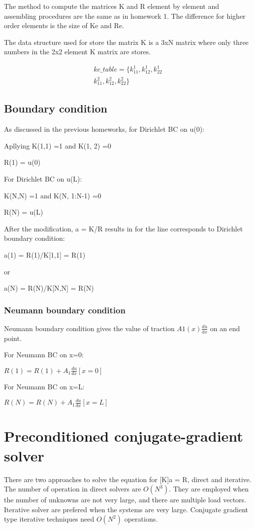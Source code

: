 \documentclass[paper=a4, fontsize=11pt]{article} %
\begin{document}
The method to compute the matrices K and R element by element and assembling procedures are the same as in homework 1. The difference for higher order elements is the size of Ke and Re.   

The data structure used for store the matrix K is a 3xN matrix where only three numbers in the 2x2 element K matrix are stores.

\begin{eqnarray}
ke\_table = \{ k_{11}^1, k_{12}^1, k_{22}^1 \\
               k_{11}^2, k_{12}^2, k_{22}^2 \} 
\end{eqnarray}
 
 \subsection{Boundary condition}

As discussed in the previous homeworks, for Dirichlet BC on u(0):

Apllying K(1,1) =1 and K(1, 2) =0 

R(1) = u(0)

For Dirichlet BC on u(L):

K(N,N) =1 and K(N, 1:N-1) =0 

R(N) = u(L)

After the modification, a = K/R results in for the line corresponds to Dirichlet boundary condition: 

a(1) = R(1)/K[1,1] = R(1)

or
 
a(N) = R(N)/K[N,N] = R(N) 

\subsubsection{Neumann boundary condition}
Neumann boundary condition gives the value of traction $A1(x)\frac{du}{dx}$ on an end point.

For Neumann BC on x=0:

 $R(1) = R(1) + A_1 \frac{du}{dx}[x=0] $


For Neumann BC on x=L:

 $R(N)=R(N)+ A_1 \frac{du}{dx}[x=L] $
\section{Preconditioned conjugate-gradient solver}
There are two approaches to solve the equation for [K]{a} = {R}, direct and iterative. The number of operation in direct solvers are  $O(N^3)$. They are employed when the number of unknowns are not very large, and there are multiple load vectors. Iterative solver are prefered when the systems are very large. Conjugate gradient type iterative techniques need $O(N^2)$ operations. 
\end{document}
